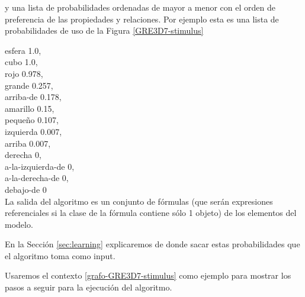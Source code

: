y una lista de probabilidades ordenadas de mayor a menor con el orden de preferencia de las propiedades y relaciones. Por ejemplo esta es una lista de probabilidades de uso de la Figura \ref{GRE3D7-stimulus}

esfera 1.0, \\
cubo 1.0,\\
rojo 0.978,\\ 
grande 0.257,\\ 
arriba-de 0.178,\\ 
amarillo 0.15,\\
peque\~no 0.107,\\ 
izquierda 0.007,\\
arriba 0.007, \\
derecha 0, \\
a-la-izquierda-de 0, \\
a-la-derecha-de 0, \\
debajo-de 0\\


La salida del algoritmo es un conjunto de f\'ormulas (que ser\'an expresiones referenciales si la clase de la f\'ormula contiene s\'olo 1 objeto) de los elementos del modelo. 


En la Secci\'on \ref{sec:learning} explicaremos de donde sacar estas probabilidades que el algoritmo toma como input.

Usaremos el contexto \ref{grafo-GRE3D7-stimulus} como ejemplo para mostrar los pasos a seguir para la ejecuci\'on del algoritmo.



